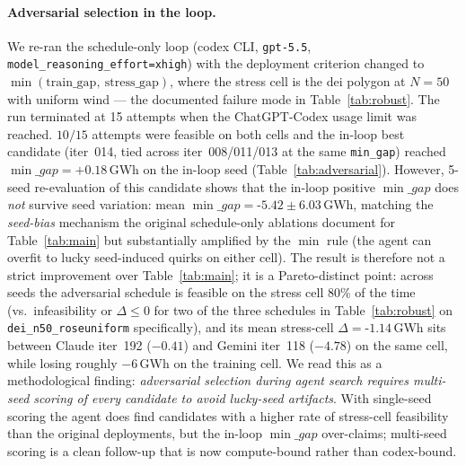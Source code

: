 \documentclass{article}
\newcommand{\AdvValSeeds}{5}
\newcommand{\AdvValStressGapMean}{$-$1.14}
\newcommand{\AdvValMinGapMean}{$-$5.42}
\newcommand{\AdvValMinGapStd}{6.03}
\newcommand{\AdvValBothFeasPct}{80\%}
\begin{document}
\paragraph{Adversarial selection in the loop.}
We re-ran the schedule-only loop (codex CLI, \texttt{gpt-5.5},
\texttt{model\_reasoning\_effort=xhigh}) with the deployment
criterion changed to $\min(\text{train\_gap},\
\text{stress\_gap})$, where the stress cell is the dei polygon at
$N{=}50$ with uniform wind --- the documented failure mode in
Table~\ref{tab:robust}. The run terminated at 15 attempts when
the ChatGPT-Codex usage limit was reached. $10/15$ attempts were
feasible on both cells and the in-loop best candidate (iter~014,
tied across iter~008/011/013 at the same \texttt{min\_gap})
reached $\min\_gap=+0.18$\,GWh on the in-loop seed
(Table~\ref{tab:adversarial}). However,
\AdvValSeeds-seed re-evaluation of this candidate shows that the
in-loop positive $\min\_gap$ does \emph{not} survive seed
variation: mean $\min\_gap=\AdvValMinGapMean\pm\AdvValMinGapStd$\,GWh,
matching the \emph{seed-bias} mechanism the original
schedule-only ablations document for Table~\ref{tab:main} but
substantially amplified by the $\min$ rule (the agent can
overfit to lucky seed-induced quirks on either cell).
The result is therefore not a strict improvement over
Table~\ref{tab:main}; it is a Pareto-distinct point: across seeds
the adversarial schedule is feasible on the stress cell
\AdvValBothFeasPct{} of the time
(vs.\ infeasibility or $\Delta\le 0$ for two of the three
schedules in Table~\ref{tab:robust} on \texttt{dei\_n50\_roseuniform}
specifically), and its mean stress-cell $\Delta=\AdvValStressGapMean$\,GWh
sits between Claude iter~192 ($-0.41$) and Gemini iter~118
($-4.78$) on the same cell, while losing roughly $-6$\,GWh on the
training cell. We read this as a methodological finding:
\emph{adversarial selection during agent search requires
multi-seed scoring of every candidate to avoid lucky-seed
artifacts}. With single-seed scoring the agent does find
candidates with a higher rate of stress-cell feasibility than the
original deployments, but the in-loop $\min\_gap$ over-claims;
multi-seed scoring is a clean follow-up that is now compute-bound
rather than codex-bound.
\end{document}

